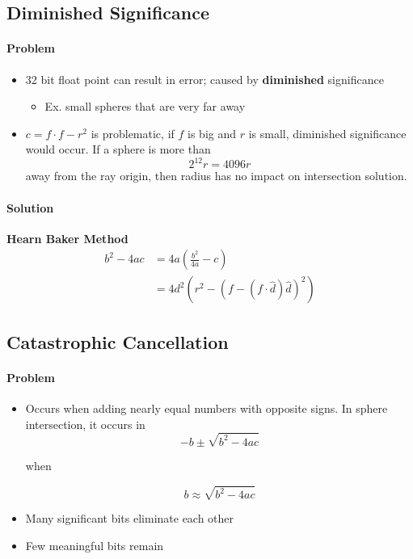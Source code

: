   \subsection{Diminished Significance}

    \paragraph{Problem}
    \begin{itemize}
      \item 32 bit float point can result in error; caused by
      \textbf{diminished} significance
      \begin{itemize}
        \item Ex. small spheres that are very far away
      \end{itemize}

      \item $ c = f \cdot f - r^{2}  $ is problematic, if $ f $ is big and $ r $ is
      small, diminished significance would occur. If a sphere is more than
      \begin{equation}
        2^{12} r = 4096 r
      \end{equation}
      away from the ray origin, then radius has no impact on intersection
      solution.
    \end{itemize}

    \paragraph{Solution} \textbf{Hearn Baker Method}
    \begin{align}
      b^{2} - 4ac &= 4a \left( \frac{b^{2}}{4a} - c \right) \\
      &= 4d^{2} \left( r^{2} - \left( f - \left( f \cdot \hat{d} \right) \hat{d} \right)^{2} \right)
    \end{align}

  \subsection{Catastrophic Cancellation}

    \paragraph{Problem}
    \begin{itemize}
      \item Occurs when adding nearly equal numbers with opposite signs.
      In sphere intersection, it occurs in
      \begin{equation*}
        -b \pm \sqrt{b^{2} - 4ac}
      \end{equation*}

      when

      \begin{equation*}
        b \approx \sqrt{b^{2} - 4ac}
      \end{equation*}

      \item Many significant bits eliminate each other
      \item Few meaningful bits remain
    \end{itemize}

